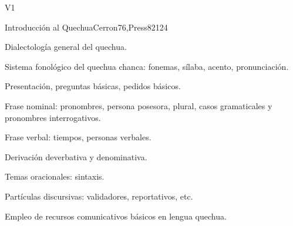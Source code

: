 \begin{syllabus}
\begin{competences}{V1}
    \item {}
    \item {}
    \item {}
    \item {}
\end{competences}

\begin{unit}{Introducción al Quechua}{}{Cerron76,Press82}{12}{4}
   \begin{topics}
      \item Dialectología general del quechua.
      \item Sistema fonológico del quechua chanca: fonemas, sílaba, acento, pronunciación.
      \item Presentación, preguntas básicas, pedidos básicos.
      \item Frase nominal: pronombres, persona posesora, plural, casos gramaticales y pronombres interrogativos.
      \item Frase verbal: tiempos, personas verbales.
      \item Derivación deverbativa y denominativa.
      \item Temas oracionales: sintaxis.
      \item Partículas discursivas: validadores, reportativos, etc.
                
   \end{topics}

   \begin{learningoutcomes}
      \item Empleo de recursos comunicativos básicos en lengua quechua.
   \end{learningoutcomes}
\end{unit}

\begin{coursebibliography}
\end{coursebibliography}

\end{syllabus}
